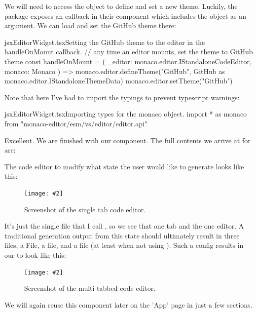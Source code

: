 \documentclass[a4paper,headinclude=on,footinclude=on,12pt,oneside]{scrbook}
\makeatletter
\newcommand{\standardfigure}[3]{\begin{figure}[H]\begin{center}\texttt{[image: \#2]}\caption{#3}\label{fig:#2}\end{center}\end{figure}}
\newcommand{\at}{\makeatletter @\makeatother}
\makeatother
\begin{document}
We will need to access the  object to define and set a new theme. Luckily, the \codeword{\at monaco-editor/react} package exposes an  callback in their component which includes the  object as an argument. We can load and set the GitHub theme there:

\begin{codeInput}{jsx}{EditorWidget.tsx}{Setting the GitHub theme to the editor in the handleOnMount callback.}
// any time an editor mounts, set the theme to GitHub theme
const handleOnMount = (
  _editor: monaco.editor.IStandaloneCodeEditor,
  monaco: Monaco
) => {
  monaco.editor.defineTheme("GitHub", GitHub as monaco.editor.IStandaloneThemeData)
  monaco.editor.setTheme("GitHub")
}
\end{codeInput}

Note that here I've had to import the typings to prevent typescript warnings:

\begin{codeInput}{jsx}{EditorWidget.tsx}{Importing types for the monaco object.}
import * as monaco from "monaco-editor/esm/vs/editor/editor.api"
\end{codeInput}

Excellent. We are finished with our  component. The full contents we arrive at for  are:


The code editor to modify what state the user would like to generate looks like this:

\standardfigure{\textwidth}{frontend/components/single-editor}{Screenshot of the single tab code editor.}

It's just the single file that I call , so we see that one tab and the one editor. A traditional generation output from this state should ultimately result in three files, a  File, a  file, and a  file (at least when not using ). Such a config results in our  to look like this:

\standardfigure{\textwidth}{frontend/components/multi-editor}{Screenshot of the multi tabbed code editor.}

We will again reuse this component later on the 'App' page in just a few sections.

\end{document}
